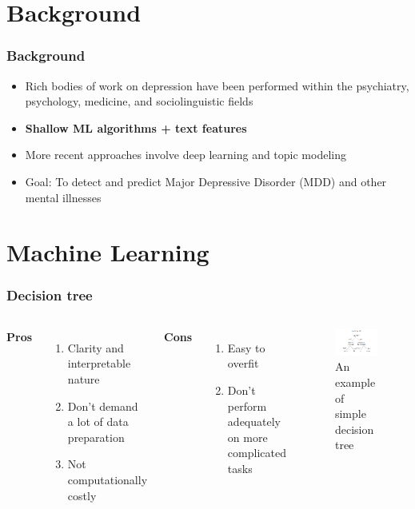 \documentclass{beamer}
\begin{document}
\section{Background}

\begin{frame}
\frametitle{Background}

		\begin{itemize}
		\item Rich bodies of work on depression have been performed within the psychiatry, psychology, medicine, and sociolinguistic fields 
		\item \textbf{Shallow ML algorithms + text features}
		\item More recent approaches involve deep learning and topic modeling
		\item Goal: To detect and predict Major Depressive Disorder (MDD) and other mental illnesses
	\end{itemize}



\end{frame}

\section{Machine Learning}

\begin{frame}
	\frametitle{Decision tree}	
	\begin{columns}[c] %
		
		\textbf{Pros}
		\begin{enumerate}
			\item Clarity and interpretable nature
			\item Don't demand a lot of data preparation
			\item Not computationally costly
		\end{enumerate} 
	
		\textbf{Cons}
		\begin{enumerate}
			\item Easy to overfit
			\item Don't perform adequately on more complicated tasks
		\end{enumerate}
		
		\begin{figure}[h]
			\includegraphics[width=7cm]{decision-tree}
			\caption{An example of simple decision tree}
		\end{figure}
		
	\end{columns}	
\end{frame}
\end{document}
